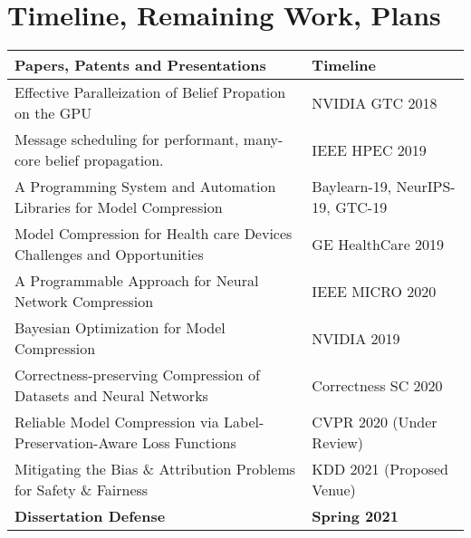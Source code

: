 \section{Timeline, Remaining Work, Plans}
\label{sec:timeline}

\begin{table*}[h]
\centering
\begin{center}
\begin{sc}
\begin{tabular}{ll}
\toprule
\textbf{Papers, Patents and Presentations}                                                  & \textbf{Timeline}        \\ \midrule
Effective Paralleization of Belief Propation on the GPU                  & NVIDIA GTC 2018          \\ 
Message scheduling for performant, many-core belief propagation.         & IEEE HPEC 2019           \\ \midrule
A Programming System and Automation Libraries for Model Compression                           & Baylearn-19, NeurIPS-19, GTC-19 \\
Model Compression for Health care Devices Challenges and Opportunities    & GE HealthCare 2019       \\
A Programmable Approach for Neural Network  Compression                  & IEEE MICRO 2020          \\
Bayesian Optimization for Model Compression                              & NVIDIA 2019              \\ \midrule
Correctness-preserving Compression of Datasets and Neural Networks & Correctness SC 2020      \\
Reliable Model Compression via Label-Preservation-Aware Loss Functions   & CVPR 2020 (Under Review) \\
Mitigating the Bias \& Attribution Problems for Safety \& Fairness & KDD 2021 (Proposed Venue)                             \\ \midrule
\textbf{Dissertation Defense}                                            & \textbf{Spring 2021} \\   
\bottomrule
\end{tabular}
\label{tab:results}
  \end{sc}
\end{center}
\end{table*}

